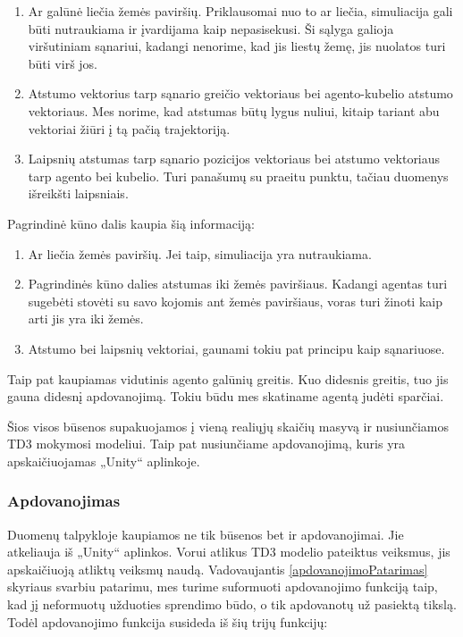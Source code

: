\documentclass[a4paper, 12pt]{article}
\begin{document}
\begin{enumerate}
  \addtolength{\itemsep}{-0.5\baselineskip} 
  \item Ar galūnė liečia žemės paviršių. Priklausomai nuo to ar liečia, simuliacija gali būti nutraukiama ir įvardijama kaip nepasisekusi. Ši sąlyga galioja viršutiniam sąnariui, kadangi nenorime, kad jis liestų žemę, jis nuolatos turi būti virš jos.
  \item Atstumo vektorius tarp sąnario greičio vektoriaus bei agento-kubelio atstumo vektoriaus. Mes norime, kad atstumas būtų lygus nuliui, kitaip tariant abu vektoriai žiūri į tą pačią trajektoriją.
  \item Laipsnių atstumas tarp sąnario pozicijos vektoriaus bei atstumo vektoriaus tarp agento bei kubelio. Turi panašumų su praeitu punktu, tačiau duomenys išreikšti laipsniais.
\end{enumerate}

Pagrindinė kūno dalis kaupia šią informaciją:
\begin{enumerate}
  \addtolength{\itemsep}{-0.5\baselineskip} 
  \item Ar liečia žemės paviršių. Jei taip, simuliacija yra nutraukiama.
  \item Pagrindinės kūno dalies atstumas iki žemės paviršiaus. Kadangi agentas turi sugebėti stovėti su savo kojomis ant žemės paviršiaus, voras turi žinoti kaip arti jis yra iki žemės.
  \item Atstumo bei laipsnių vektoriai, gaunami tokiu pat principu kaip sąnariuose.
\end{enumerate}

Taip pat kaupiamas vidutinis agento galūnių greitis. Kuo didesnis greitis, tuo jis gauna didesnį apdovanojimą. Tokiu būdu mes skatiname agentą judėti sparčiai.

Šios visos būsenos supakuojamos į vieną realiųjų skaičių masyvą ir nusiunčiamos TD3 mokymosi modeliui. Taip pat nusiunčiame apdovanojimą, kuris yra apskaičiuojamas „Unity“ aplinkoje.

\subsubsection{Apdovanojimas}

Duomenų talpykloje kaupiamos ne tik būsenos bet ir apdovanojimai. Jie atkeliauja iš „Unity“ aplinkos. Vorui atlikus TD3 modelio pateiktus veiksmus, jis apskaičiuoją atliktų veiksmų naudą. Vadovaujantis \ref{apdovanojimoPatarimas} skyriaus svarbiu patarimu, mes turime suformuoti apdovanojimo funkciją taip, kad jį neformuotų užduoties sprendimo būdo, o tik apdovanotų už pasiektą tikslą. Todėl apdovanojimo funkcija susideda iš šių trijų funkcijų:
\end{document}
